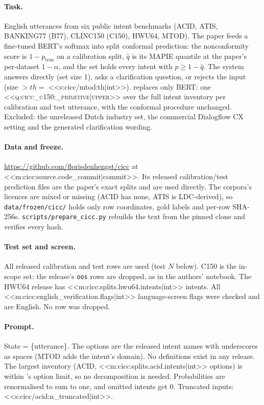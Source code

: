 \paragraph{Task.} English utterances from six public intent benchmarks (ACID, ATIS, BANKING77 (B77), CLINC150 (C150),
HWU64, MTOD). The paper feeds a fine-tuned BERT's softmax into split conformal prediction: the nonconformity score is
$1-p_{\text{true}}$ on a calibration split, $\hat q$ is its MAPIE quantile at the paper's per-dataset $1-\alpha$, and
the set holds every intent with $p\geq 1-\hat q$. The system answers directly (set size 1), asks a clarification
question, or rejects the input (size $>\mathit{th}=$ <<s:cicc/mtod:th|int>>). \jev{} replaces only BERT: one
\textsc{<<q:cicc_c150:_primitive|upper>>} over the full intent inventory per calibration and test utterance, with
the conformal procedure unchanged. Excluded: the unreleased Dutch industry set, the commercial Dialogflow CX setting
and the generated clarification wording.

\paragraph{Data and freeze.} \url{https://github.com/florisdenhengst/cicc} at <<m:cicc:source.code_commit|commit>>.
Its released calibration/test prediction files are the paper's exact splits and are used directly. The corpora's
licences are mixed or missing (ACID has none, ATIS is LDC-derived), so \texttt{data/frozen/cicc/} holds only row
coordinates, gold labels and per-row SHA-256s. \texttt{scripts/prepare\_cicc.py} rebuilds the text from the pinned
clone and verifies every hash.

\paragraph{Test set and screen.} All released calibration and test rows are used (test $N$ below). C150 is the
in-scope set: the release's \texttt{oos} rows are dropped, as in the authors' notebook. The HWU64 release has
<<m:cicc:splits.hwu64.intents|int>> intents. All <<m:cicc:english_verification.flags|int>> language-screen flags
were checked and are English. No row was dropped.

\paragraph{Prompt.} State = \{utterance\}. The options are the released intent names with underscores as spaces
(MTOD adds the intent's domain). No definitions exist in any release. The largest inventory (ACID,
<<m:cicc:splits.acid.intents|int>> options) is within \jev{}'s option limit, so no decomposition is needed.
Probabilities are renormalised to sum to one, and omitted intents get 0. Truncated inputs:
<<s:cicc/acid:n_truncated|int>>.

